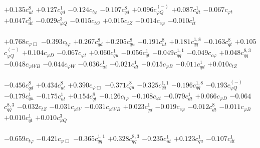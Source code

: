 \documentclass{article}
\begin{document}
{$+0.135$}{\rm $c_{ut}^{8}$} 
{$+0.127$}{\rm $c_{qd}^{1}$} 
{$-0.124$}{\rm $c_{t \varphi}$} 
{$-0.107$}{\rm $c_{qd}^{8}$} 
{$+0.096$}{\rm $c_{\varphi Q}^{(-)}$} 
{$+0.087$}{\rm $c_{dt}^{1}$} 
{$-0.067$}{\rm $c_{\varphi t}$} 
{$+0.047$}{\rm $c_{dt}^{8}$} 
{$-0.029$}{\rm $c_{\varphi Q}^{3}$} 
{$-0.015$}{\rm $c_{tG}$} 
{$+0.015$}{\rm $c_{tZ}$} 
{$-0.014$}{\rm $c_{c \varphi}$} 
{$-0.010$}{\rm $c_{tt}^{1}$} 
 \nonumber \\ \nonumber \\ 
{$+0.768$}{\rm $c_{\varphi \Box}$} 
{$-0.393$}{\rm $c_{t \varphi}$} 
{$+0.267$}{\rm $c_{qd}^{8}$} 
{$+0.205$}{\rm $c_{qu}^{8}$} 
{$-0.191$}{\rm $c_{ut}^{8}$} 
{$+0.181$}{\rm $c_{qq}^{1,8}$} 
{$-0.163$}{\rm $c_{qt}^{8}$} 
{$+0.105$}{\rm $c_{\varphi Q}^{(-)}$} 
{$+0.104$}{\rm $c_{\varphi D}$} 
{$-0.067$}{\rm $c_{\varphi t}$} 
{$+0.060$}{\rm $c_{qu}^{1}$} 
{$-0.056$}{\rm $c_{qt}^{1}$} 
{$-0.049$}{\rm $c_{qq}^{1,1}$} 
{$-0.049$}{\rm $c_{c \varphi}$} 
{$+0.048$}{\rm $c_{qq}^{8,3}$} 
{$-0.048$}{\rm $c_{\varphi WB}$} 
{$-0.044$}{\rm $c_{\varphi W}$} 
{$-0.036$}{\rm $c_{ut}^{1}$} 
{$-0.021$}{\rm $c_{dt}^{1}$} 
{$-0.015$}{\rm $c_{\varphi B}$} 
{$-0.011$}{\rm $c_{qd}^{1}$} 
{$+0.010$}{\rm $c_{tZ}$} 
 \nonumber \\ \nonumber \\ 
{$-0.456$}{\rm $c_{qd}^{8}$} 
{$+0.434$}{\rm $c_{ut}^{8}$} 
{$+0.390$}{\rm $c_{\varphi \Box}$} 
{$-0.371$}{\rm $c_{qu}^{8}$} 
{$-0.325$}{\rm $c_{qq}^{1,1}$} 
{$-0.196$}{\rm $c_{qq}^{1,8}$} 
{$-0.193$}{\rm $c_{\varphi Q}^{(-)}$} 
{$-0.179$}{\rm $c_{qu}^{1}$} 
{$-0.175$}{\rm $c_{ut}^{1}$} 
{$+0.154$}{\rm $c_{qt}^{8}$} 
{$-0.126$}{\rm $c_{t \varphi}$} 
{$+0.108$}{\rm $c_{\varphi t}$} 
{$-0.079$}{\rm $c_{dt}^{1}$} 
{$+0.066$}{\rm $c_{\varphi D}$} 
{$-0.064$}{\rm $c_{qq}^{8,3}$} 
{$-0.032$}{\rm $c_{tZ}$} 
{$-0.031$}{\rm $c_{\varphi W}$} 
{$-0.031$}{\rm $c_{\varphi WB}$} 
{$+0.023$}{\rm $c_{qd}^{1}$} 
{$-0.019$}{\rm $c_{c \varphi}$} 
{$-0.012$}{\rm $c_{dt}^{8}$} 
{$-0.011$}{\rm $c_{\varphi B}$} 
{$+0.010$}{\rm $c_{qt}^{1}$} 
{$+0.010$}{\rm $c_{\varphi Q}^{3}$} 
 \nonumber \\ \nonumber \\ 
{$-0.659$}{\rm $c_{t \varphi}$} 
{$-0.421$}{\rm $c_{\varphi \Box}$} 
{$-0.365$}{\rm $c_{qq}^{1,1}$} 
{$+0.328$}{\rm $c_{qq}^{8,3}$} 
{$-0.235$}{\rm $c_{ut}^{1}$} 
{$+0.123$}{\rm $c_{qu}^{1}$} 
{$-0.107$}{\rm $c_{dt}^{1}$} 
\end{document}
